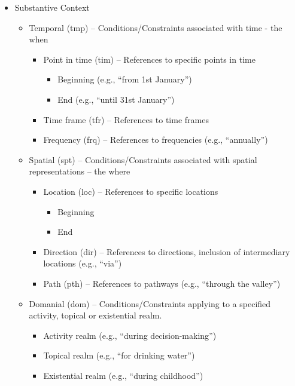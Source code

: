 \begin{itemize}
\item[] Substantive Context

\begin{itemize}
\item Temporal (tmp) -- Conditions/Constraints associated with time - the when
	\begin{itemize}
	\item Point in time (tim) -- References to specific points in time
		\begin{itemize}
		\item Beginning (e.g., ``from 1st January'')
		\item End (e.g., ``until 31st January'')
		\end{itemize}	
	\item Time frame (tfr) -- References to time frames
	\item Frequency (frq) -- References to frequencies (e.g., ``annually'') 
	\end{itemize}
\item Spatial (spt) -- Conditions/Constraints associated with spatial representations -- the where
	\begin{itemize}
	\item Location (loc) -- References to specific locations
		\begin{itemize}
		\item Beginning
		\item End
		\end{itemize}
	\item Direction (dir) -- References to directions, inclusion of intermediary locations (e.g., ``via'')
	\item Path (pth) -- References to pathways (e.g., ``through the valley'')
	\end{itemize}
\item Domanial (dom) -- Conditions/Constraints applying to a specified activity, topical or existential realm. 
\begin{itemize}
\item Activity realm  (e.g., ``during decision-making'')
\item Topical realm (e.g., ``for drinking water'')
\item Existential realm (e.g., ``during childhood'')
\end{itemize}
\end{itemize}
\end{itemize}

